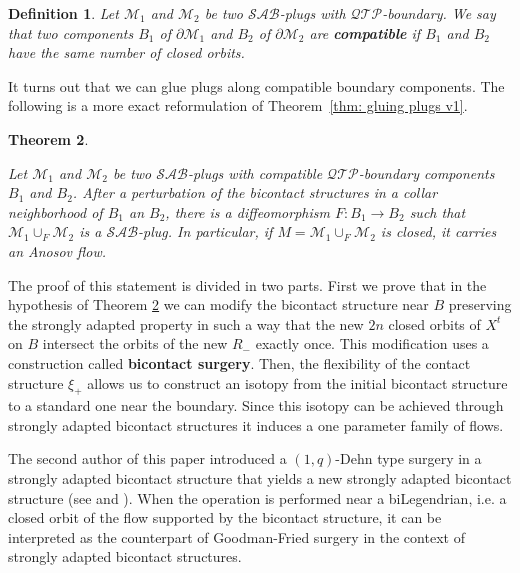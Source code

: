 \documentclass{amsart}
\newtheorem{theorem}{Theorem}[section]
\newtheorem{definition}[theorem]{Definition}
\theoremstyle{definition}
\theoremstyle{remark}
\begin{document}
 \begin{definition} 
    Let $\mathcal{M}_1$ and $\mathcal{M}_2$ be two $\mathcal{SAB}$-plugs with $\mathcal{QTP}$-boundary. We say that two components $B_1$ of $\partial \mathcal{M}_1$ and $B_2$ of $\partial \mathcal{M}_2$ are \textbf{compatible} if $B_1$ and $B_2$ have the same number of closed orbits.
\end{definition}


It turns out that we can glue plugs along compatible boundary components. The following is a more exact reformulation of Theorem~\ref{thm: gluing plugs v1}.

\begin{theorem}\label{thm: gluing plugs}

Let $\mathcal{M}_1$ and $\mathcal{M}_2$ be two $\mathcal{SAB}$-plugs with compatible $\mathcal{QTP}$-boundary components $B_1$ and $B_2$. After a perturbation of the bicontact structures in a collar neighborhood of $B_1$ an $B_2$, there is a diffeomorphism $F:B_1\rightarrow B_2$ such that $\mathcal{M}_1 \cup_F \mathcal{M}_2$ is a $\mathcal{SAB}$-plug. In particular, if $M=\mathcal{M}_1 \cup_F \mathcal{M}_2$ is closed, it carries an Anosov flow.
\end{theorem}





The proof of this statement is divided in two parts. First we prove that in the hypothesis of Theorem \ref{thm: gluing plugs} we can modify the bicontact structure near $B$ preserving the strongly adapted property in such a way that the new $2n$ closed orbits of $X^t$ on $B$ intersect the orbits of the new $R_-$ exactly once. This modification uses a construction called \textbf{bicontact surgery}. Then, the flexibility of the contact structure $\xi_+$ allows us to construct an isotopy from the initial bicontact structure to a standard one near the boundary. Since this isotopy can be achieved through strongly adapted bicontact structures it induces a one parameter family of flows. 

The second author of this paper introduced a $(1,q)$-Dehn type surgery in a strongly adapted bicontact structure that yields a new strongly adapted bicontact structure (see \cite{Sal1} and \cite{Sal2}). When the operation is performed near a biLegendrian, i.e. a closed orbit of the flow supported by the bicontact structure, it can be interpreted as the counterpart of Goodman-Fried surgery in the context of strongly adapted bicontact structures.
\end{document}
